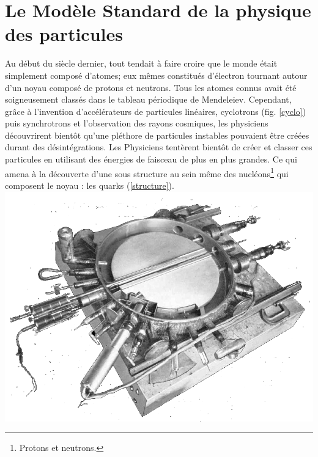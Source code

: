 \section{Le Modèle Standard de la physique des particules}
 
Au début du siècle dernier, tout tendait à faire croire que le monde était simplement composé d'atomes; eux mêmes constitués d'électron tournant autour d'un noyau composé de protons et neutrons. Tous les atomes connus avait été soigneusement classés dans le tableau périodique de Mendeleiev. Cependant, grâce à l'invention d'accélérateurs de particules linéaires, cyclotrons (fig. \ref{cyclo}) puis synchrotrons et l'observation des rayons cosmiques, les physiciens découvrirent bientôt qu'une pléthore de particules instables pouvaient être créées durant des désintégrations. Les Physiciens tentèrent bientôt de créer et classer ces particules en utilisant des énergies de faisceau de plus en plus grandes. Ce qui amena à la découverte d'une sous structure au sein même des nucléons\footnote{Protons et neutrons.} qui composent le noyau : les quarks (\ref{structure}).
\marginpar
{
	\includegraphics[width=\marginparwidth]{SM/cyclotron.png}
    	\label{cyclo}
}
